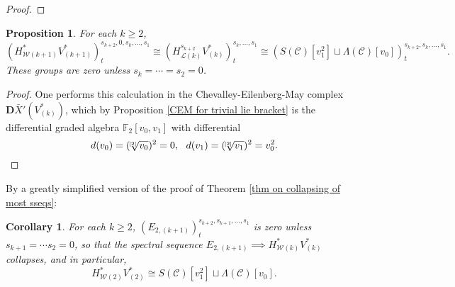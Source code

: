 \documentclass[11pt]{amsart} \renewcommand{\baselinestretch}{1.2}
\theoremstyle{plain}
\newtheorem{prop}[thm]{Proposition}
\newtheorem{cor}[thm]{Corollary}
\numberwithin{equation}{section} %
\theoremstyle{plain}
\newtheorem{prop}[thm]{Proposition}
\newtheorem{cor}[thm]{Corollary}
\numberwithin{equation}{chapter} %
\newcommand{\scrC}{\mathscr{C}}
\newcommand{\calL}{\mathcal{L}}
\newcommand{\calw}{\mathcal{W}}
\newcommand{\CommOperad}{{\scrC}}
\newcommand{\dualrestn}[1]{\sqrt[{[2]}]{#1}}
\renewcommand{\dualrestn}[1]{\sqrt[{\!\!\![2]}]{#1}}
\newcommand{\UEAX}{\bar{X}'}%
\newcommand{\F}{\mathbb{F}}
\newcommand{\Ftwo}{\F_2}
\newcommand{\dual}{\mathbf{D}}
\begin{document}
\begin{Calculations of HWn}
\begin{proof}
\end{proof}
\begin{prop}
For each $k\geq2$,
\[(H^*_{\calw(k+1)}V^*_{(k+1)})^{s_{k+2},0,s_k,\ldots,s_1}_{t}\cong (H^{s_{k+2}}_{\calL(k)}V^*_{(k)})^{s_k,\ldots,s_1}_t\cong (S(\CommOperad)[v_1^{2}]\sqcup \Lambda(\CommOperad)[v_0])_t^{s_{k+2},s_{k},\ldots,s_1}.\]
These groups are zero unless $s_k=\cdots =s_2=0$.
\end{prop}
\begin{proof}
One performs this calculation in the Chevalley-Eilenberg-May complex $\dual\UEAX(V^*_{(k)})$, which by Proposition \ref{CEM for trivial lie bracket} is the differential graded algebra $\Ftwo [v_0,v_1]$ with differential
\[d(v_0)=(\dualrestn{v_0})^2=0,\ \ d(v_1)=(\dualrestn{v_1})^2=v_0^2.\qedhere\]
\end{proof}
By a greatly simplified version of the proof of Theorem \ref{thm on collapsing of most sseqs}:
\begin{cor}
\label{statement of result on 2d w2 example}
For each $k\geq2$, $(E_{2,(k+1)})^{s_{k+2},s_{k+1},\ldots,s_1}_{t}$ is zero unless $s_{k+1}=\cdots s_2=0$, so that the spectral sequence $E_{2,(k+1)}\implies H^*_{\calw(k)}V^*_{(k)}$ collapses, and in particular,
\[H^*_{\calw(2)}V^*_{(2)}\cong S(\CommOperad) [v_1^{2}]\sqcup \Lambda(\CommOperad)[v_0].\]
\end{cor}


\end{Calculations of HWn}
\end{document}
